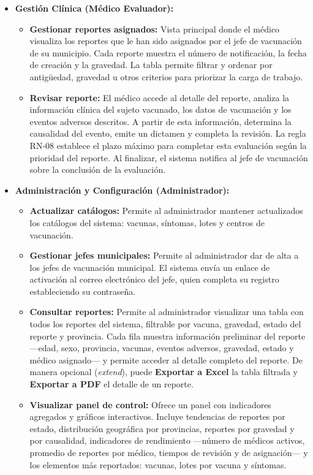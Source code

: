 \documentclass[12pt,letterpaper]{article}
\begin{document}
\begin{itemize}
\item \textbf{Gestión Clínica (Médico Evaluador):}
\begin{itemize}
\item \textbf{Gestionar reportes asignados:} Vista principal donde el médico visualiza los reportes que le han sido asignados por el jefe de vacunación de su municipio. Cada reporte muestra el número de notificación, la fecha de creación y la gravedad. La tabla permite filtrar y ordenar por antigüedad, gravedad u otros criterios para priorizar la carga de trabajo.
\item \textbf{Revisar reporte:} El médico accede al detalle del reporte, analiza la información clínica del sujeto vacunado, los datos de vacunación y los eventos adversos descritos. A partir de esta información, determina la causalidad del evento, emite un dictamen y completa la revisión. La regla RN-08 establece el plazo máximo para completar esta evaluación según la prioridad del reporte. Al finalizar, el sistema notifica al jefe de vacunación sobre la conclusión de la evaluación.
\end{itemize}

\item \textbf{Administración y Configuración (Administrador):}
\begin{itemize}
\item \textbf{Actualizar catálogos:} Permite al administrador mantener actualizados los catálogos del sistema: vacunas, síntomas, lotes y centros de vacunación.
\item \textbf{Gestionar jefes municipales:} Permite al administrador dar de alta a los jefes de vacunación municipal. El sistema envía un enlace de activación al correo electrónico del jefe, quien completa su registro estableciendo su contraseña.
\item \textbf{Consultar reportes:} Permite al administrador visualizar una tabla con todos los reportes del sistema, filtrable por vacuna, gravedad, estado del reporte y provincia. Cada fila muestra información preliminar del reporte —edad, sexo, provincia, vacunas, eventos adversos, gravedad, estado y médico asignado— y permite acceder al detalle completo del reporte. De manera opcional (\textit{extend}), puede \textbf{Exportar a Excel} la tabla filtrada y \textbf{Exportar a PDF} el detalle de un reporte.
\item \textbf{Visualizar panel de control:} Ofrece un panel con indicadores agregados y gráficos interactivos. Incluye tendencias de reportes por estado, distribución geográfica por provincias, reportes por gravedad y por causalidad, indicadores de rendimiento —número de médicos activos, promedio de reportes por médico, tiempos de revisión y de asignación— y los elementos más reportados: vacunas, lotes por vacuna y síntomas.
\end{itemize}
\end{itemize}
\end{document}
